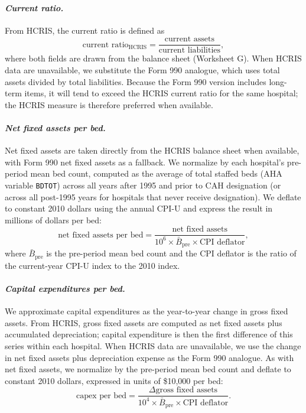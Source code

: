 \documentclass[a4paper, 12pt]{article}
\begin{document}
\paragraph{\textit{Current ratio.}} From HCRIS, the current ratio is defined as
$$
\text{current ratio}_{\text{HCRIS}} = \frac{\text{current assets}}{\text{current liabilities}},
$$
where both fields are drawn from the balance sheet (Worksheet G). When HCRIS data are unavailable, we substitute the Form 990 analogue, which uses total assets divided by total liabilities. Because the Form 990 version includes long-term items, it will tend to exceed the HCRIS current ratio for the same hospital; the HCRIS measure is therefore preferred when available.

\paragraph{\textit{Net fixed assets per bed.}} Net fixed assets are taken directly from the HCRIS balance sheet when available, with Form 990 net fixed assets as a fallback. We normalize by each hospital's pre-period mean bed count, computed as the average of total staffed beds (AHA variable \texttt{BDTOT}) across all years after 1995 and prior to CAH designation (or across all post-1995 years for hospitals that never receive designation). We deflate to constant 2010 dollars using the annual CPI-U and express the result in millions of dollars per bed:
$$
\text{net fixed assets per bed} = \frac{\text{net fixed assets}}{10^6 \times \bar{B}_{\text{pre}} \times \text{CPI deflator}},
$$
where $\bar{B}_{\text{pre}}$ is the pre-period mean bed count and the CPI deflator is the ratio of the current-year CPI-U index to the 2010 index.

\paragraph{\textit{Capital expenditures per bed.}} We approximate capital expenditures as the year-to-year change in gross fixed assets. From HCRIS, gross fixed assets are computed as net fixed assets plus accumulated depreciation; capital expenditure is then the first difference of this series within each hospital. When HCRIS data are unavailable, we use the change in net fixed assets plus depreciation expense as the Form 990 analogue. As with net fixed assets, we normalize by the pre-period mean bed count and deflate to constant 2010 dollars, expressed in units of \$10,000 per bed:
$$
\text{capex per bed} = \frac{\Delta\text{gross fixed assets}}{10^4 \times \bar{B}_{\text{pre}} \times \text{CPI deflator}}.
$$
\end{document}
